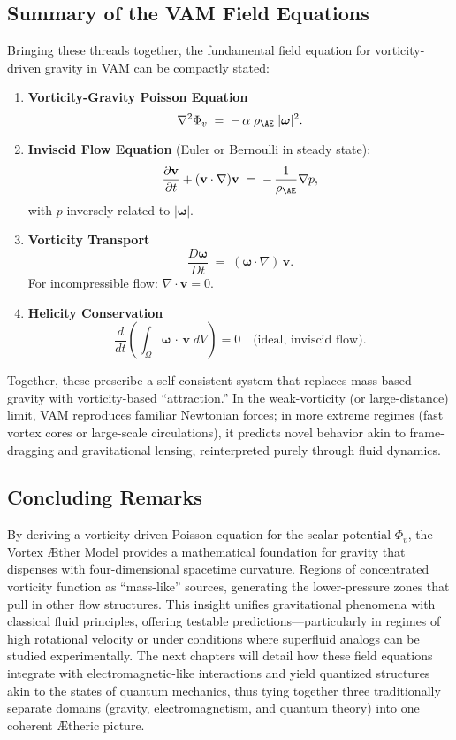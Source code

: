 \subsection{Summary of the VAM Field Equations}

Bringing these threads together, the fundamental field equation for vorticity-driven gravity in VAM can be compactly stated:

\begin{enumerate}
    \item \textbf{Vorticity-Gravity Poisson Equation}
    \[
        \nabla^2 \Phi_v \;=\; -\,\alpha\;\rho_{\mathrm{\AE}}\;\lvert \boldsymbol{\omega} \rvert^2.
    \]

    \item \textbf{Inviscid Flow Equation} (Euler or Bernoulli in steady state):
    \[
        \frac{\partial \mathbf{v}}{\partial t} + (\mathbf{v}\cdot\nabla)\mathbf{v} \;=\; -\,\frac{1}{\rho_{\mathrm{\AE}}}\nabla p,
    \]
    with \(p\) inversely related to \(\lvert \boldsymbol{\omega} \rvert\).

    \item \textbf{Vorticity Transport}
    \[
        \frac{D \boldsymbol{\omega}}{Dt} \;=\;  (\boldsymbol{\omega} \cdot \nabla)\,\mathbf{v}.
    \]
    For incompressible flow: \(\nabla \cdot \mathbf{v} = 0\).

    \item \textbf{Helicity Conservation}
    \[
        \frac{d}{dt}  \left( \int_{\Omega} \boldsymbol{\omega}\,\cdot\,\mathbf{v}\; dV \right) = 0  \quad \text{(ideal, inviscid flow)}.
    \]
\end{enumerate}

Together, these prescribe a self-consistent system that replaces mass-based gravity with vorticity-based “attraction.” In the weak-vorticity (or large-distance) limit, VAM reproduces familiar Newtonian forces; in more extreme regimes (fast vortex cores or large-scale circulations), it predicts novel behavior akin to frame-dragging and gravitational lensing, reinterpreted purely through fluid dynamics.

\subsection{Concluding Remarks}

By deriving a vorticity-driven Poisson equation for the scalar potential \(\Phi_v\), the Vortex Æther Model provides a mathematical foundation for gravity that dispenses with four-dimensional spacetime curvature. Regions of concentrated vorticity function as “mass-like” sources, generating the lower-pressure zones that pull in other flow structures. This insight unifies gravitational phenomena with classical fluid principles, offering testable predictions—particularly in regimes of high rotational velocity or under conditions where superfluid analogs can be studied experimentally. The next chapters will detail how these field equations integrate with electromagnetic-like interactions and yield quantized structures akin to the states of quantum mechanics, thus tying together three traditionally separate domains (gravity, electromagnetism, and quantum theory) into one coherent Ætheric picture.


